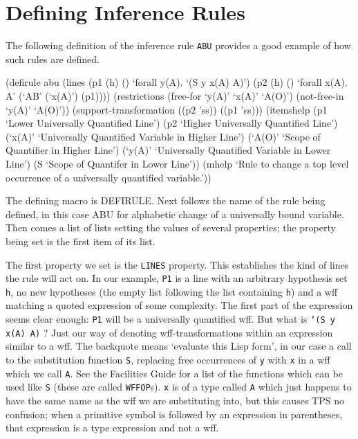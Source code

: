 \section{Defining Inference Rules}

The following definition of the inference rule {\tt ABU} provides
a good example of how such rules are defined.

\begin{lispcode}

(defirule abu
  (lines (p1 (h) () `forall y(A). `(S y x(A) A)')
	 (p2 (h) () `forall x(A). A' (`AB' (`x(A)') (p1))))
  (restrictions (free-for `y(A)' `x(A)' `A(O)')
		(not-free-in `y(A)' `A(O)'))
  (support-transformation ((p2 'ss)) ((p1 'ss)))
  (itemshelp (p1 `Lower Universally Quantified Line')
	     (p2 `Higher Universally Quantified Line')
	     (`x(A)' `Universally Quantified Variable in Higher Line')
	     (`A(O)' `Scope of Quantifier in Higher Line')
	     (`y(A)' `Universally Quantified Variable in Lower Line')
	     (S `Scope of Quantifer in Lower Line'))
  (mhelp `Rule to change a top level occurrence of a universally quantified
 variable.'))

\end{lispcode}

The defining macro is DEFIRULE. Next follows the name of the rule
being defined, in this case ABU for alphabetic change of a universally
bound variable. Then comes a list of lists setting the values of
several properties; the property being set is the first item of its list.

The first property we set is the {\tt LINES} property. This establishes the kind
of lines the rule will act on. In our example, {\tt P1} is a line with an
arbitrary hypothesis set {\tt h}, no new hypotheses (the empty list following
the list containing {\tt h}) and a wff matching a quoted expression of some
complexity. The first part of the expression seems clear enough: {\tt P1}
will be a universally quantified wff. But what is {\tt `(S y x(A) A)} ?
Just our way of denoting wff-transformations within an expression
similar to a wff. The backquote means `evaluate this Lisp form', in our case
a call to the substitution function {\tt S}, replacing free occurrences
of {\tt y} with {\tt x} in a wff which we call {\tt A}. See the Facilities Guide for
a list of the functions which can be used like {\tt S} (these are called
{\tt WFFOP}s). {\tt x} is of a type
called {\tt A} which just happens to have the same name as the wff we are
substituting into, but this causes TPS no confusion; when a primitive symbol is
followed by an expression in parentheses, that expression is a type expression
and not a wff.

